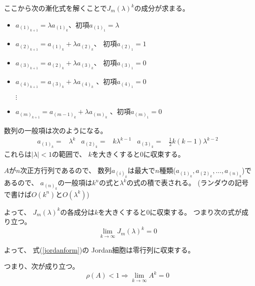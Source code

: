 \documentclass[12pt,b5paper]{ltjsarticle}
\begin{document}
ここから次の漸化式を解くことで$J_m(\lambda)^k$の成分が求まる。
\begin{itemize}
 \item $a_{(1)_{k+1}} = \lambda a_{(1)_k}$、\quad 初項$a_{(1)_1}=\lambda$
 \item $a_{(2)_{k+1}} = a_{(1)_k} + \lambda a_{(2)_k}$、 \quad 初項$a_{(2)_1}=1$
 \item $a_{(3)_{k+1}} = a_{(2)_k} + \lambda a_{(3)_k}$、 \quad 初項$a_{(3)_1}=0$
 \item $a_{(4)_{k+1}} = a_{(3)_k} + \lambda a_{(4)_k}$ 、\quad 初項$a_{(4)_1}=0$

       $\vdots$
 \item $a_{(m)_{k+1}} = a_{(m-1)_k} + \lambda a_{(m)_k}$ 、\quad 初項$a_{(m)_1}=0$
\end{itemize}

数列の一般項は次のようになる。
\begin{align}
 a_{(1)_{k}} =& \lambda^k &
 a_{(2)_{k}} =& k\lambda^{k-1} &
 a_{(3)_{k}} =& \frac{1}{2}k(k-1)\lambda^{k-2}
\end{align}
これらは$\lvert \lambda \rvert <1$の範囲で、
$k$を大きくすると0に収束する。

$A$が$n$次正方行列であるので、
数列$a_{(i)_k}$は最大で$n$種類($a_{(1)_{k}},a_{(2)_{k}},\dots,a_{(n)_{k}}$)であるので、
$a_{(n)_{k}}$の一般項は$k^n$の式と$\lambda^k$の式の積で表される。
(ランダウの記号で書けば$O(k^n)$と$O(\lambda^k)$)

よって、
$J_m(\lambda)^k$の各成分は$k$を大きくすると0に収束する。
つまり次の式が成り立つ。
\begin{equation}
 \lim_{k\rightarrow \infty}J_m(\lambda)^k =0
\end{equation}

よって、
式(\ref{jordanform})の
Jordan細胞は零行列に収束する。

つまり、次が成り立つ。
\begin{equation}
 \rho(A)<1 \Rightarrow \lim_{k\rightarrow \infty} A^k =0
\end{equation}

\hrulefill
\end{document}

